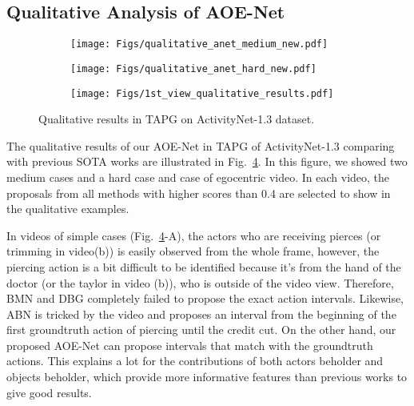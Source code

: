 \documentclass[sn-mathphys]{sn-jnl}
\theoremstyle{thmstyleone}\newtheorem{theorem}{Theorem}\newtheorem{proposition}[theorem]{Proposition}
\theoremstyle{thmstyletwo}\newtheorem{example}{Example}\newtheorem{remark}{Remark}
\theoremstyle{thmstylethree}\newtheorem{definition}{Definition}
\begin{document}
\subsection{Qualitative Analysis of AOE-Net}

\begin{figure}[!ht]
     \centering
     \begin{subfigure}[b]{0.8\textwidth}
         \centering
         \texttt{[image: Figs/qualitative\_anet\_medium\_new.pdf]}
         \label{fig:anet2}
     \vspace{-3mm}
     \end{subfigure}
     \begin{subfigure}[b]{0.8\textwidth}
         \centering
         \texttt{[image: Figs/qualitative\_anet\_hard\_new.pdf]}
         \label{fig:anet3}
     \vspace{-3mm}
     \end{subfigure}
     \begin{subfigure}[b]{0.8\textwidth}
         \centering
         \texttt{[image: Figs/1st\_view\_qualitative\_results.pdf]}
         \label{fig:anet4}
     \end{subfigure}
\vspace{-3mm}   
\caption{Qualitative results in TAPG on ActivityNet-1.3 \cite{caba2015activitynet} dataset.}
        \label{fig:qualitative_anet}
\end{figure}



The qualitative results of our AOE-Net in TAPG of ActivityNet-1.3 \cite{caba2015activitynet} comparing with previous SOTA works \cite{bmn, dbg, KhoaVo_Access} are illustrated in Fig.~\ref{fig:qualitative_anet}. In this figure, we showed two medium cases and a hard case and case of egocentric video. In each video, the proposals from all methods with higher scores than 0.4 are selected to show in the qualitative examples.

In videos of simple cases (Fig.~\ref{fig:qualitative_anet}-A), the actors who are receiving pierces (or trimming in video(b)) is easily observed from the whole frame, however, the piercing action is a bit difficult to be identified because it's from the hand of the doctor (or the taylor in video (b)), who is outside of the video view. Therefore, BMN \cite{bmn} and DBG \cite{dbg} completely failed to propose the exact action intervals. Likewise, ABN \cite{KhoaVo_Access} is tricked by the video and proposes an interval from the beginning of the first groundtruth action of piercing until the credit cut. On the other hand, our proposed AOE-Net can propose intervals that match with the groundtruth actions. This explains a lot for the contributions of both actors beholder and objects beholder, which provide more informative features than previous works to give good results.
\end{document}
